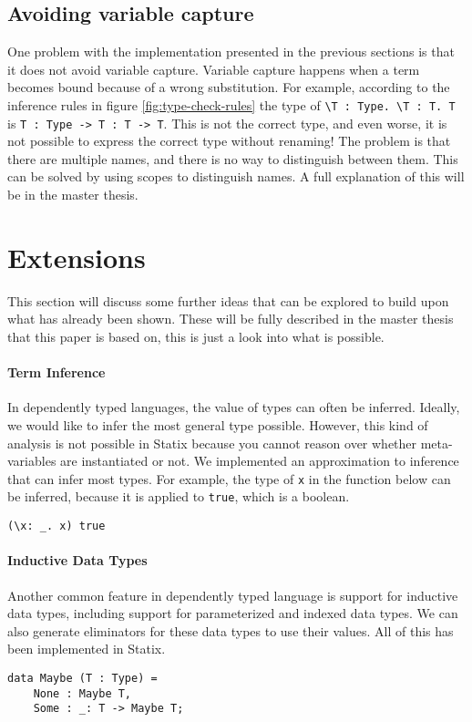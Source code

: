 \documentclass[a4paper,UKenglish,cleveref, autoref, thm-restate]{oasics-v2021}
\begin{document}
\subsection{Avoiding variable capture}
One problem with the implementation presented in the previous sections is that it does not avoid variable capture. Variable capture happens when a term becomes bound because of a wrong substitution. For example, according to the inference rules in figure \ref{fig:type-check-rules} the type of \verb|\T : Type. \T : T. T| is \verb|T : Type -> T : T -> T|. This is not the correct type, and even worse, it is not possible to express the correct type without renaming! The problem is that there are multiple names, and there is no way to distinguish between them. This can be solved by using scopes to distinguish names. A full explanation of this will be in the master thesis. 

\section{Extensions}
\label{sec:extensions}
This section will discuss some further ideas that can be explored to build upon what has already been shown. These will be fully described in the master thesis that this paper is based on, this is just a look into what is possible.

\paragraph*{Term Inference}
In dependently typed languages, the value of types can often be inferred. Ideally, we would like to infer the most general type possible. However, this kind of analysis is not possible in Statix because you cannot reason over whether meta-variables are instantiated or not. We implemented an approximation to inference that can infer most types. For example, the type of \verb|x| in the function below can be inferred, because it is applied to \verb|true|, which is a boolean.
\begin{lstlisting}
(\x: _. x) true
\end{lstlisting}

\paragraph*{Inductive Data Types}
Another common feature in dependently typed language is support for inductive data types, including support for parameterized and indexed data types. We can also generate eliminators for these data types to use their values. All of this has been implemented in Statix. 
\begin{lstlisting}
data Maybe (T : Type) = 
    None : Maybe T,
    Some : _: T -> Maybe T;
\end{lstlisting}
\end{document}
